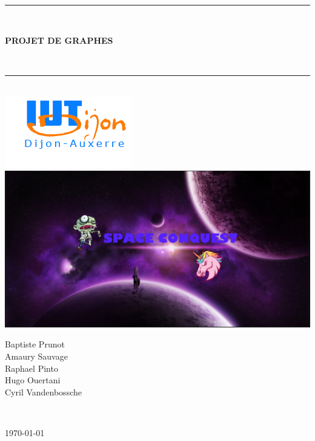 \documentclass{report}
\begin{document}
	\begin{titlepage}
	
		\begin{center}
			
			\hrule\\[1cm]
			\begin{Huge}
				\textbf{PROJET DE GRAPHES}
			\end{Huge}\\[1cm]
			\hrule\\[1cm]
			
			\includegraphics[scale=0.5]{Images/iut.png}\\[1cm]
			
			\includegraphics[scale=0.30]{Images/fondMenu.png}\\[2cm]
			\begin{center}
			\begin{Large}
				Baptiste Prunot\\
				Amaury Sauvage\\
				Raphael Pinto\\
				Hugo Ouertani\\
				Cyril Vandenbossche\\
				\end{Large}\\[2cm]
				
				
					\begin{flushright}
					\today
					\end{flushright}
					
				
				
				
			
			\end{center}
		\end{center}
		
	\end{titlepage}	
	
\end{document}
